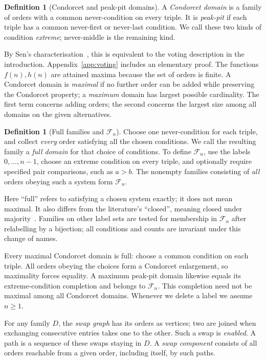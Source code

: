 \documentclass[11pt,letterpaper]{article}
\theoremstyle{definition}
\newtheorem{definition}[theorem]{Definition}
\newcommand{\F}{\mathcal F}
\begin{document}
\begin{definition}[Condorcet and peak-pit domains]\label{def:cd}
A \emph{Condorcet domain} is a family of orders with a common
never-condition on every triple. It is \emph{peak-pit} if each triple
has a common never-first or never-last condition. We call these two
kinds of condition \emph{extreme}; never-middle is the remaining kind.
\end{definition}
By Sen's characterisation~\cite{Sen}, this is equivalent to the voting
description in the introduction. Appendix~\ref{app:voting} includes
an elementary proof. The functions \(f(n),h(n)\) are attained maxima
because the set of orders is finite. A Condorcet domain is \emph{maximal}
if no further order can be added while preserving the Condorcet property;
a \emph{maximum} domain has largest possible cardinality. The first term concerns adding orders; the second concerns
the largest size among all domains on the given alternatives.

\begin{definition}[Full families and \(\F_n\)]\label{def:full}
Choose one never-condition for each triple, and collect \emph{every}
order satisfying all the chosen conditions. We call the resulting
family a \emph{full domain} for that choice of conditions.
To define \(\F_n\), use the labels \(0,\ldots,n-1\), choose an
extreme condition on every triple, and optionally require specified
pair comparisons, such as \(a>b\). The nonempty families consisting
of \emph{all} orders obeying such a system form \(\F_n\).
\end{definition}
Here ``full'' refers to satisfying a chosen system exactly; it does not
mean maximal. It also differs from the literature's ``closed'', meaning
closed under majority~\cite{PuppeSlinko}. Families on other label sets
are tested for membership in \(\F_n\) after relabelling by a bijection;
all conditions and counts are invariant under this change of names.

Every maximal Condorcet domain is full: choose a common condition on
each triple. All orders obeying the choices form a Condorcet enlargement,
so maximality forces equality. A maximum peak-pit domain likewise equals
its extreme-condition completion and belongs to \(\F_n\).
This completion need not be maximal among all Condorcet domains.
Whenever we delete a label we assume \(n\geq1\).

For any family \(D\), the \emph{swap graph} has its orders as vertices;
two are joined when exchanging consecutive entries takes one to the
other. Such a swap is \emph{enabled}. A path is a sequence of these
swaps staying in \(D\). A \emph{swap component} consists of all orders
reachable from a given order, including itself, by such paths.
\end{document}
